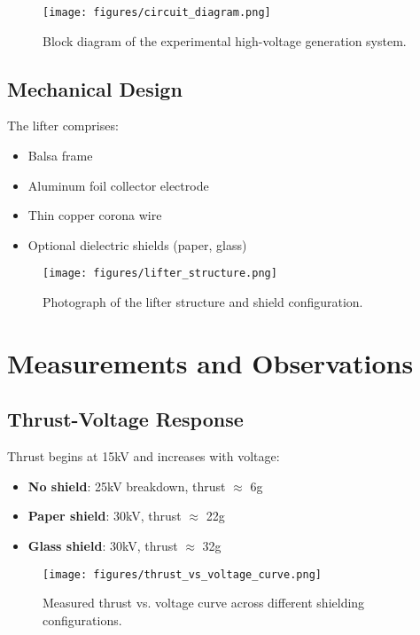     \begin{figure}[h!]
        \centering
        \texttt{[image: figures/circuit\_diagram.png]}
        \caption{Block diagram of the experimental high-voltage generation system.}
    \end{figure}

    \subsection{Mechanical Design}
    The lifter comprises:
    \begin{itemize}
        \item Balsa frame
        \item Aluminum foil collector electrode
        \item Thin copper corona wire
        \item Optional dielectric shields (paper, glass)
    \end{itemize}

    \begin{figure}[h!]
        \centering
        \texttt{[image: figures/lifter\_structure.png]}
        \caption{Photograph of the lifter structure and shield configuration.}
    \end{figure}

    \section{Measurements and Observations}
    \subsection{Thrust-Voltage Response}
    Thrust begins at 15kV and increases with voltage:
    \begin{itemize}
        \item \textbf{No shield}: 25kV breakdown, thrust $\approx$ 6g
        \item \textbf{Paper shield}: 30kV, thrust $\approx$ 22g
        \item \textbf{Glass shield}: 30kV, thrust $\approx$ 32g
    \end{itemize}

    \begin{figure}[h!]
        \centering
        \texttt{[image: figures/thrust\_vs\_voltage\_curve.png]}
        \caption{Measured thrust vs. voltage curve across different shielding configurations.}
    \end{figure}

